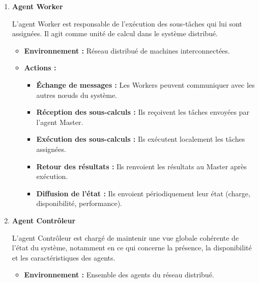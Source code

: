 \documentclass[12pt,a4paper]{report}
\theoremstyle{definition}
\begin{document}
\begin{enumerate}
\begin{itemize}
\begin{itemize}
\item[$-$] \textbf{Diffusion de son état :} Il communique son état au reste du système lorsque nécessaire.
    \end{itemize}
\end{itemize}

\item \textbf{Agent Worker}

L’agent Worker est responsable de l’exécution des sous-tâches qui lui sont assignées. Il agit comme unité de calcul dans le système distribué.

\begin{itemize}
    \item [$\bullet$]\textbf{Environnement :} Réseau distribué de machines interconnectées.

    \item [$\bullet$]\textbf{Actions :}
    \begin{itemize}
        \item[$-$] \textbf{Échange de messages :} Les Workers peuvent communiquer avec les autres nœuds du système.
        
        \item[$-$] \textbf{Réception des sous-calculs :} Ils reçoivent les tâches envoyées par l’agent Master.
        
        \item [$-$]\textbf{Exécution des sous-calculs :} Ils exécutent localement les tâches assignées.
        
        \item [$-$]\textbf{Retour des résultats :} Ils renvoient les résultats au Master après exécution.
        
        \item [$-$]\textbf{Diffusion de l’état :} Ils envoient périodiquement leur état (charge, disponibilité, performance).
    \end{itemize}
\end{itemize}

\item \textbf{Agent Contrôleur}

L’agent Contrôleur est chargé de maintenir une vue globale cohérente de l’état du système, notamment en ce qui concerne la présence, la disponibilité et les caractéristiques des agents.

\begin{itemize}
    \item[$\bullet$] \textbf{Environnement :} Ensemble des agents du réseau distribué.


\end{itemize}
\end{enumerate}
\end{document}
